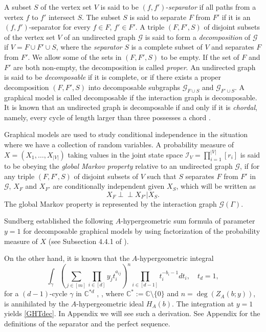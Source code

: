 \documentclass[a4paper,12pt]{article}
\theoremstyle{plain}
\theoremstyle{remark}
\begin{document}
A subset $S$ of the vertex set $V$ is said to be
$(f,f')$-{\it separator} if all paths from a vertex $f$ to
$f'$ intersect $S$. The subset $S$ is said to separate $F$
from $F'$ if it is an $(f,f')$-separator for every $f\in F$,
$f'\in F'$. A triple $(F,F',S)$ of disjoint subsets of
the vertex set $V$ of an undirected graph $\mathcal{G}$ is
said to form a {\it decomposition} of $\mathcal{G}$ if
$V=F\cup F'\cup S$, where the {\it separator} $S$ is
a complete subset of $V$ and separates $F$ from $F'$.
We allow some of the sets in $(F,F',S)$ to be empty.
If the set of $F$ and $F'$ are both non-empty,
the decomposition is called {\it proper}. An undirected graph
is said to be {\it decomposable} if it is complete, or if
there exists a proper decomposition $(F,F',S)$ into
decomposable subgraphs $\mathcal{G}_{F\cup S}$ and
$\mathcal{G}_{F'\cup S}$. A graphical model is called
decomposable if the interaction graph is decomposable.
It is known that an undirected graph is decomposable if
and only if it is {\it chordal}, namely, every cycle of
length larger than three possesses a chord \cite[Proposition 2.5]{Lau94}.

Graphical models are used to study conditional independence
in the situation where we have a collection of random variables.
A probability measure of $X=(X_1,\ldots,X_{|V|})$ taking values
in the joint state space $\mathcal{I}_V=\prod_{i=1}^{|V|}[r_i]$
is said to be obeying the {\it global Markov property} relative
to an undirected graph $\mathcal{G}$, if for any triple
$(F,F',S)$ of disjoint subsets of $V$ such that $S$ separates
$F$ from $F'$ in $\mathcal{G}$, $X_F$ and $X_{F'}$ are
conditionally independent given $X_S$, which will be written as
\begin{equation}
  X_F \perp\!\!\!\perp X_{F'} | X_S. \label{markov}
\end{equation}
The global Markov property is represented by
the interaction graph $\mathcal{G}(\Gamma)$.

Sundberg \cite{Sun75} established the following $A$-hypergeometric
sum formula of parameter $y=1$ for decomposable graphical models
by using factorization of the probability measure of $X$
(see Subsection 4.4.1 of \cite{Lau94}).

On the other hand, it is known that the $A$-hypergeometric integral
\begin{equation}
  \int_\gamma
  \left(\sum_{j\in[m]}\prod_{i\in[d]} y_jt_i^{a_{ij}}\right)^n
  \prod_{i\in[d-1]}t_i^{-b_i-1} dt_i, \quad t_d=1,
  \label{GKZint}
\end{equation}
for a $(d-1)$-cycle $\gamma$ in
$\mathbb{C}^{*d}$ \cite[Theorem 2.7]{GKZ90}, \cite[Theorem 5.4.2]{SST00},
where $\mathbb{C}^*:=\mathbb{C}\setminus\{0\}$
and $n=\deg(Z_A(b;y))$, is annihilated by the $A$-hypergeometric
ideal $H_A(b)$. The integration at $y=1$ yields \eqref{GHTdec}.
In Appendix we will see such a derivation. See Appendix for
the definitions of the separator and the perfect sequence.
\end{document}
